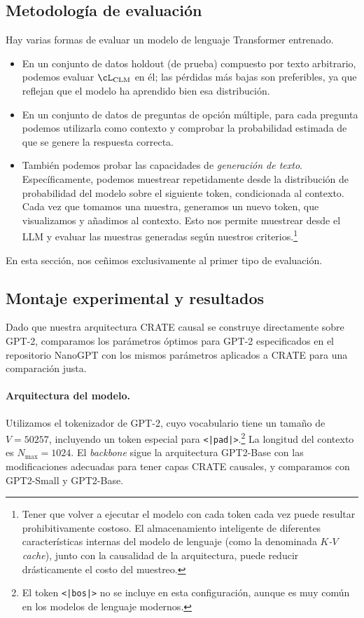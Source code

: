 \documentclass[../../book-main_es.tex]{subfiles}
\begin{document}
\subsection{Metodología de evaluación} \label{sub:clm_text_evals}

Hay varias formas de evaluar un modelo de lenguaje Transformer entrenado.
\begin{itemize}
\item En un conjunto de datos holdout (de prueba) compuesto por texto arbitrario, podemos evaluar
\(\cL_{\mathrm{CLM}}\) en él; las pérdidas más bajas son preferibles, ya que reflejan
que el modelo ha aprendido bien esa distribución.
\item En un conjunto de datos de preguntas de opción múltiple, para cada pregunta podemos
utilizarla como contexto y comprobar la probabilidad estimada de que
se genere la respuesta correcta.
\item También podemos probar las capacidades de \textit{generación de texto}.
Específicamente, podemos muestrear repetidamente desde la distribución de probabilidad
del modelo sobre el siguiente token, condicionada al contexto. Cada vez que
tomamos una muestra, generamos un nuevo token, que visualizamos y añadimos al
contexto. Esto nos permite muestrear desde el LLM y evaluar las
muestras generadas según nuestros criterios.\footnote{Tener que volver a ejecutar el
    modelo con cada token cada vez puede resultar prohibitivamente costoso.
    El almacenamiento inteligente de diferentes características internas del modelo de lenguaje
    (como la denominada \textit{\(K\)-\(V\) cache}), junto con la
causalidad de la arquitectura, puede reducir drásticamente el costo del muestreo.}
\end{itemize}
En esta sección, nos ceñimos exclusivamente al primer tipo de evaluación.

\subsection{Montaje experimental y resultados}

Dado que nuestra arquitectura CRATE causal se construye directamente sobre GPT-2,
comparamos los parámetros óptimos para GPT-2 especificados en el repositorio NanoGPT
\citep{nanogpt} con los mismos parámetros aplicados a CRATE
para una comparación justa.

\paragraph{Arquitectura del modelo.} Utilizamos el tokenizador de GPT-2, cuyo vocabulario tiene 
un tamaño de \(V = 50257\), incluyendo un token especial para
\texttt{<|pad|>}.\footnote{El token \texttt{<|bos|>} no se incluye
en esta configuración, aunque es muy común en los modelos de lenguaje modernos.}
La longitud del contexto es \(N_{\max} = 1024\). El \textit{backbone} sigue
la arquitectura GPT2-Base \citep{radford2019language} con las
modificaciones adecuadas para tener capas CRATE causales, y comparamos
con GPT2-Small y GPT2-Base.
\end{document}
